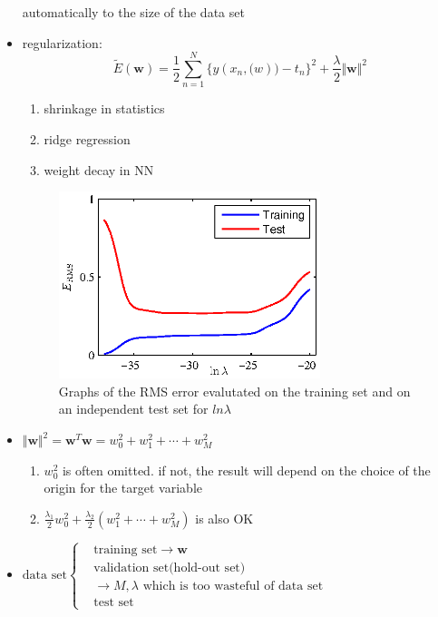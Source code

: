 \documentclass[UTF8]{article}
\begin{document}
\begin{itemize}
        automatically to the size of the data set
        \item regularization:
        \[
            \widetilde{E}(\bm{w})=\frac{1}{2}\sum_{n=1}^N\{y(x_n,\bm(w))
            -t_n\}^2+\frac{\lambda}{2}\Vert\bm{w}\Vert^2
            \]
        \begin{enumerate}
            \item shrinkage in statistics
            \item ridge regression
            \item weight decay in NN
        \end{enumerate}
        \begin{figure}[ht]
            \begin{center}
                \includegraphics[width=3in]{figures/Figure1_8.eps}
                \caption{Graphs of the RMS error evalutated on the training 
                set and on an independent test set for $ln\lambda$}
            \end{center}
        \end{figure}
        \item $\Vert\bm{w}\Vert^2=\bm{w}^T\bm{w}=w_0^2+w_1^2+\cdots+w_M^2$
        \begin{enumerate}
            \item $w_0^2$ is often omitted. if not, the result will depend
            on the choice of the origin for the target variable
            \item $\frac{\lambda_1}{2}w_0^2+\frac{\lambda_2}{2}(w_1^2+
            \cdots+w_M^2)$ is also OK 
        \end{enumerate}
        \item $\text{data set}\begin{cases}
            &\text{training set}\rightarrow\bm{w}\\
            &\text{validation set(hold-out set)}\\
            &\rightarrow M,\lambda
            \text{ which is too wasteful of data set}\\
            &\text{test set}
            \end{cases}$
    \end{itemize}
\end{document}
